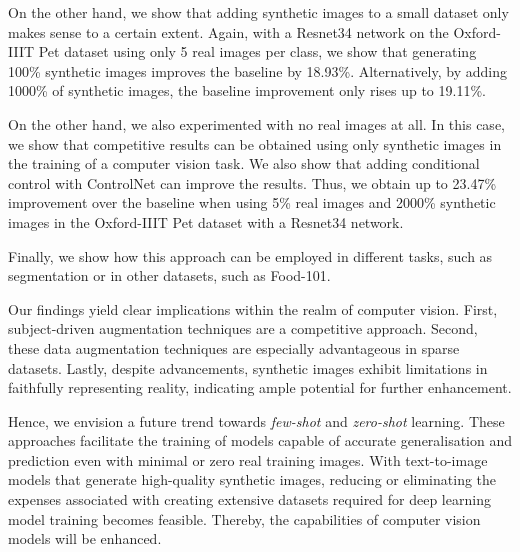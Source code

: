 On the other hand, we show that adding synthetic images to a small dataset only makes sense to a certain extent. Again, with a Resnet34 network on the Oxford-IIIT Pet dataset using only 5 real images per class, we show that generating 100\% synthetic images improves the baseline by 18.93\%. Alternatively, by adding 1000\% of synthetic images, the baseline improvement only rises up to 19.11\%. 

On the other hand, we also experimented with no real images at all. In this case, we show that competitive results can be obtained using only synthetic images in the training of a computer vision task. We also show that adding conditional control with ControlNet can improve the results. Thus, we obtain up to 23.47\% improvement over the baseline when using 5\% real images and 2000\% synthetic images in the Oxford-IIIT Pet dataset with a Resnet34 network. 

Finally, we show how this approach can be employed in different tasks, such as segmentation or in other datasets, such as Food-101.

Our findings yield clear implications within the realm of computer vision. First, subject-driven augmentation techniques are a competitive approach. Second, these data augmentation techniques are especially advantageous in sparse datasets. Lastly, despite advancements, synthetic images exhibit limitations in faithfully representing reality, indicating ample potential for further enhancement. 

Hence, we envision a future trend towards \textit{few-shot} and \textit{zero-shot} learning. These approaches facilitate the training of models capable of accurate generalisation and prediction even with minimal or zero real training images. With text-to-image models that generate high-quality synthetic images, reducing or eliminating the expenses associated with creating extensive datasets required for deep learning model training becomes feasible. Thereby, the capabilities of computer vision models will be enhanced.